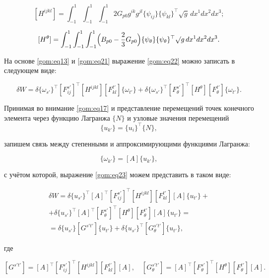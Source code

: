 $$[H^{ijkl}]=\int_{-1}^{1}\int_{-1}^{1}\int_{-1}^{1}2G_{p0}g^{ik}g^{jl}\{\psi_{ij}\}\{\psi_{kl}\}^\top \surd g \, dx^1 dx^2 dx^3;$$

$$[H^{\theta}]=\int_{-1}^{1}\int_{-1}^{1}\int_{-1}^{1}\Bigl(B_{p0}-\frac{2}{3}G_{p0}\Bigr) \{\psi_{\theta}\}\{\psi_{\theta}\}^\top \surd g \, dx^1 dx^2 dx^3.$$



На основе \eqref{gom:eq13} и \eqref{gom:eq21} выражение \eqref{gom:eq22} можно записать в следующем виде:

\begin{equation}

\label{gom:eq23}

\delta W=\delta \{\omega_{s'}\}^\top[F_{ij}^{s'}]^\top[H^{ijkl}][F_{kl}^{t'}]\{\omega_{t'}\}+\delta \{\omega_{s'}\}^\top[F_{\theta}^{s'}]^\top[H^{\theta}][F_{\theta}^{t'}]\{\omega_{t'}\}. 

\end{equation}



Принимая во внимание \eqref{gom:eq17} и представление перемещений точек конечного элемента через функцию Лагранжа $\{N\}$ и узловые значения перемещений  $$\{u_{k'}\}=\{u_{i}\}^\top\{N\},$$ 

запишем связь между степенными и аппроксимирующими функциями Лагранжа:

$$\{\omega_{k'}\}=[A]\{u_{k'}\},$$

с учётом которой, выражение \eqref{gom:eq23} можем представить в таком виде:

\begin{multline}

\delta W=\delta \{u_{s'}\}^\top[A]^\top[F_{ij}^{s'}]^\top[H^{ijkl}][F_{kl}^{t'}][A]\{u_{t'}\}+

\\

+\delta \{u_{s'}\}^\top[A]^\top[F_{\theta}^{s'}]^\top[H^{\theta}][F_{\theta}^{t'}][A]\{u_{t'}\}=

\\

=\delta \{u_{s'}\}[G^{s't'}]\{u_{t'}\}+\delta \{u_{s'}\}^\top[G_{\theta}^{s't'}]\{u_{t'}\},

\end{multline}

где 

$$[G^{s't'}]=[A]^\top[F_{ij}^{s'}]^\top[H^{ijkl}][F_{kl}^{t'}][A], \quad  [G_{\theta}^{s't'}]=[A]^\top[F_{\theta}^{s'}]^\top[H^{\theta}][F_{\theta}^{t'}][A].$$



